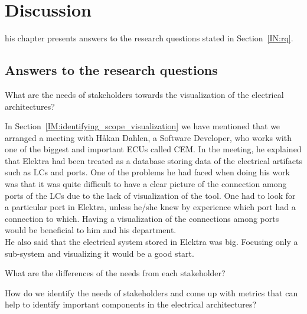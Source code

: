 \chapter{Discussion}
\lettrine[findent=2pt]{}{ }his chapter presents answers to the research questions stated in Section~\ref{IN:rq}.

\section{Answers to the research questions}
\setcounter{que}{0}

\begin{que}
What are the needs of stakeholders towards the visualization of the electrical architectures?
\end{que}

\vspace{1em}
In Section~\ref{IM:identifying_scope_visualization} we have mentioned that we arranged a meeting with Håkan Dahlen, a Software Developer, who works with one of the biggest and important ECUs called CEM. In the meeting, he explained that Elektra had been treated as a database storing data of the electrical artifacts such as LCs and ports. One of the problems he had faced when doing his work was that it was quite difficult to have a clear picture of the connection among ports of the LCs due to the lack of visualization of the tool. One had to look for a particular port in Elektra, unless he/she knew by experience which port had a connection to which. Having a visualization of the connections among ports would be beneficial to him and his department.\\

He also said that the electrical system stored in Elektra was big. Focusing only a sub-system and visualizing it would be a good start. 

\vspace{2em}

\begin{que}
What are the differences of the needs from each stakeholder?
\end{que}

\vspace{1em}
\vspace{2em}


\begin{que}
How do we identify the needs of stakeholders and come up with metrics that can help to identify important components in the electrical architectures?
\end{que}

